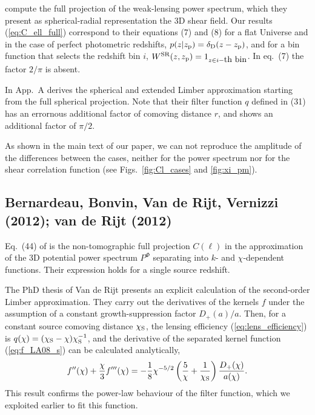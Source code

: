 \documentclass[fleqn,usenatbib]{mnras} %
\begin{document}
\begin{appendix}
\cite{2016arXiv161104954K} compute the full projection of the weak-lensing
power spectrum, which they present as spherical-radial representation the 3D
shear field. Our results (\ref{eq:C_ell_full}) correspond to their equations
(7) and (8) for a flat Universe and in the case of perfect photometric
redshifts, $p(z | z_{\rm p}) = \delta_{\rm D}(z - z_{\rm p})$, and for a bin
function that selects the redshift bin $i$, $W^{\rm SR}(z, z_{\rm p}) = 1_{z
\in i-\mbox{th bin}}$. In \cite{2016arXiv161104954K} eq.~(7) the factor $2/\pi$
is absent.

In App.~A \cite{2016arXiv161104954K} derives the spherical and extended Limber
approximation starting from the full spherical projection. Note that their
filter function $q$ defined in (31) has an errornous additional factor of
comoving distance $r$, and shows an additional factor of $\pi/2$.

As shown in the main text of our paper,
we can not reproduce the amplitude of the differences between the cases,
neither for the power spectrum nor for the shear correlation function (see
Figs.~\ref{fig:Cl_cases} and \ref{fig:xi_pm}).


\subsection{Bernardeau, Bonvin, Van de Rijt, Vernizzi (2012); van de Rijt (2012)}

Eq.~(44) of \cite{2012PhRvD..86b3001B} is the non-tomographic full projection
$C(\ell)$ in the approximation of the 3D potential power spectrum $P^\Phi$ separating
into $k$- and $\chi$-dependent functions. Their expression holds for a single
source redshift.

The PhD thesis of Van de Rijt \cite{vande2012} presents an explicit calculation
of the second-order Limber approximation. They carry out the derivatives of the
kernels $f$ under the assumption of a constant growth-suppression factor
$D_+(a)/a$. Then, for a constant source comoving distance $\chi_{\rm S}$, the
lensing efficiency (\ref{eq:lens_efficiency}) is $q(\chi) = (\chi_{\rm S} -
\chi) \chi_{\rm S}^{-1}$, and the derivative of the separated kernel function
(\ref{eq:f_LA08_s}) can be calculated analytically,
%
\begin{equation}
  f^{\prime\prime}(\chi) + \frac{\chi}{3} f^{\prime\prime\prime}(\chi)
    = - \frac 1 8 \chi^{-5/2} \left( \frac 5 \chi
          + \frac 1 {\chi_{\rm S}} \right) \frac{D_+(\chi)}{a(\chi)}.
\end{equation}
%
This result confirms the power-law behaviour of the filter function, which we exploited earlier to fit
this function.


\end{appendix}
\end{document}
